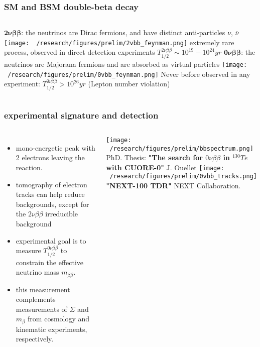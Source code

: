 \documentclass{beamer}
\begin{document}
	\begin{frame}
		\frametitle{SM and BSM double-beta decay}
		\begin{columns}[c] %
			{\footnotesize $\boldsymbol{2\nu\beta\beta}$: the neutrinos are Dirac fermions, and have distinct anti-particles $\nu$, $\overline{\nu}$} 
			\medskip
			\texttt{[image: ~/research/figures/prelim/2vbb\_feynman.png]}
			{\footnotesize extremely rare process, observed in direct detection experiments $T_{1/2}^{2\nu\beta\beta} \sim 10^{19}-10^{24} yr$}
			{\footnotesize $\boldsymbol{0\nu\beta\beta}$: the neutrinos are Majorana fermions and are absorbed as virtual particles}
			\texttt{[image: ~/research/figures/prelim/0vbb\_feynman.png]}
			{\footnotesize Never before observed in any experiment:  $T_{1/2}^{0\nu\beta\beta} > 10^{26} yr$  (Lepton number violation)}
			
		\end{columns}
	\end{frame}		
	
	\begin{frame}
		\frametitle{experimental signature and detection}
		\begin{columns}[c] %
			
			\begin{itemize}
				\setlength\itemsep{2em}
				\item mono-energetic peak with 2 electrons leaving the reaction.
				\item tomography of electron tracks can help reduce backgrounds, except for the $2\nu\beta\beta$ irreducible background
				\item experimental goal is to measure $T_{1/2}^{0\nu\beta\beta}$ to constrain the effective neutrino mass $m_{\beta\beta}$.
				\item this measurement complements measurements of $\Sigma$ and $m_{\beta}$ from cosmology and kinematic experiments, respectively.
			\end{itemize}
			
			\texttt{[image: ~/research/figures/prelim/bbspectrum.png]}
			\\ {\fontsize{4}{12} \selectfont PhD. Thesis: \textbf{"The search for $0\nu\beta\beta$ in $^{130}Te$ with CUORE-0"} J. Ouellet}
			\texttt{[image: ~/research/figures/prelim/0vbb\_tracks.png]}
			\\
			{\fontsize{4}{12} \selectfont \textbf{"NEXT-100 TDR"} NEXT Collaboration.}
			
		\end{columns}
	\end{frame}			
	
\end{document}
